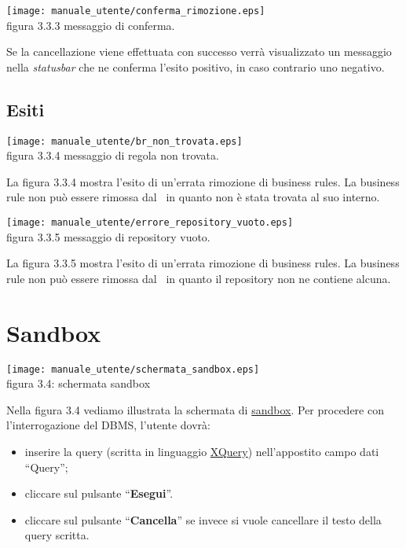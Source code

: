 \begin{center}
\texttt{[image: manuale\_utente/conferma\_rimozione.eps]}\\
 figura 3.3.3 messaggio di conferma.
\end{center} 

Se la cancellazione viene effettuata con successo verr\`a visualizzato un messaggio nella \textit{statusbar} che ne conferma l'esito positivo, in caso contrario uno negativo.
\subsection{Esiti}
 
\begin{center}
\texttt{[image: manuale\_utente/br\_non\_trovata.eps]}\\
 figura 3.3.4 messaggio di regola non trovata.
\end{center} 
La figura 3.3.4 mostra l'esito di un'errata rimozione di business rules. La business rule non pu\`o essere rimossa dal \rp\ in quanto non \`e stata trovata al suo interno.

\begin{center}
\texttt{[image: manuale\_utente/errore\_repository\_vuoto.eps]}\\
 figura 3.3.5 messaggio di repository vuoto.
\end{center} 
La figura 3.3.5 mostra l'esito di un'errata rimozione di business rules. La business rule non pu\`o essere rimossa dal \rp\ in quanto il repository non ne contiene alcuna.

\section{Sandbox}
\begin{center}
 \texttt{[image: manuale\_utente/schermata\_sandbox.eps]} \\
 figura 3.4: schermata sandbox
\end{center}
Nella figura 3.4 vediamo illustrata la schermata di \underline{sandbox}. Per procedere con l'interrogazione del DBMS, l'utente dovr\`a:
\begin{itemize}
\item inserire la query (scritta in linguaggio \underline{XQuery}) nell'appostito campo dati ``Query'';
\item cliccare sul pulsante ``\textbf{Esegui}''.
\item cliccare sul pulsante ``\textbf{Cancella}'' se invece si vuole cancellare il testo della query scritta.
\end{itemize}

